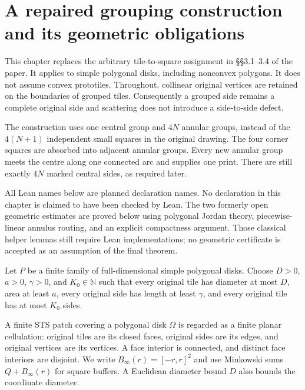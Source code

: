 \section{A repaired grouping construction and its geometric obligations}

This chapter replaces the arbitrary tile-to-square assignment in
\S\S3.1--3.4 of the paper.  It applies to simple polygonal disks, including
nonconvex polygons.  It does not assume convex prototiles.  Throughout,
collinear original vertices are retained on the boundaries of grouped tiles.
Consequently a grouped side remains a complete original side and scattering
does not introduce a side-to-side defect.

The construction uses one central group and $4N$ annular groups, instead of
the $4(N+1)$ independent small squares in the original drawing.  The four
corner squares are absorbed into adjacent annular groups.  Every new annular
group meets the centre along one connected arc and supplies one print.
There are still exactly $4N$ marked central sides, as required later.

All Lean names below are planned declaration names.  No declaration in this
chapter is claimed to have been checked by Lean.  The two formerly open
geometric estimates are proved below using polygonal Jordan theory,
piecewise-linear annulus routing, and an explicit compactness argument.
Those classical helper lemmas still require Lean implementations; no
geometric certificate is accepted as an assumption of the final theorem.

\begin{definition}
\label{def:mesh}
Let $P$ be a finite family of full-dimensional simple polygonal disks.  Choose
$D>0$, $a>0$, $\gamma>0$, and $K_0\in\mathbb N$ such that every original
tile has diameter at most $D$, area at least $a$, every original side has
length at least $\gamma$, and every original tile has at most $K_0$ sides.

A finite STS patch covering a polygonal disk $\Omega$ is regarded as a finite
planar cellulation: original tiles are its closed faces, original sides are
its edges, and original vertices are its vertices.  A face interior is
connected, and distinct face interiors are disjoint.  We write
$B_\infty(r)=[-r,r]^2$ and use Minkowski sums $Q+B_\infty(r)$ for square
buffers.  A Euclidean diameter bound $D$ also bounds the coordinate diameter.
\end{definition}

